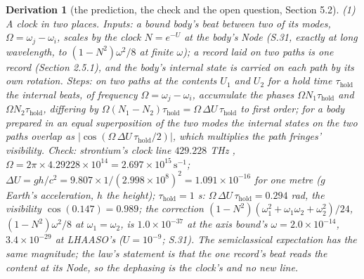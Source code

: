 \documentclass[pdflatex,sn-mathphys-num]{sn-jnl}
\theoremstyle{thmstyleone}
\newtheorem{derivation}{Derivation}
\begin{document}
\begin{derivation}[the prediction, the check and the open question, Section 5.2]
\emph{(1) A clock in two places.} \emph{Inputs:} a bound body's beat between two of its modes, $\Omega = \omega_j - \omega_i$, scales by the clock $N = e^{-U}$ at the body's Node (S.31, exactly at long wavelength, to $(1 - N^2)\omega^2 / 8$ at finite $\omega$); a record laid on two paths is one record (Section 2.5.1), and the body's internal state is carried on each path by its own rotation. \emph{Steps:} on two paths at the contents $U_1$ and $U_2$ for a hold time $\tau_{\mathrm{hold}}$ the internal beats, of frequency $\Omega = \omega_j - \omega_i$, accumulate the phases $\Omega N_1 \tau_{\mathrm{hold}}$ and $\Omega N_2 \tau_{\mathrm{hold}}$, differing by $\Omega(N_1 - N_2)\tau_{\mathrm{hold}} = \Omega\,\Delta U\,\tau_{\mathrm{hold}}$ to first order; for a body prepared in an equal superposition of the two modes the internal states on the two paths overlap as $|\cos(\Omega\,\Delta U\,\tau_{\mathrm{hold}} / 2)|$, which multiplies the path fringes' visibility. \emph{Check:} strontium's clock line $429.228$ THz \cite{sr_clock}, $\Omega = 2\pi \times 4.29228 \times 10^{14} = 2.697 \times 10^{15}\,\mathrm{s}^{-1}$; $\Delta U = gh / c^2 = 9.807 \times 1 / (2.998 \times 10^8)^2 = 1.091 \times 10^{-16}$ for one metre ($g$ Earth's acceleration, $h$ the height); $\tau_{\mathrm{hold}} = 1$ s: $\Omega\,\Delta U\,\tau_{\mathrm{hold}} = 0.294$ rad, the visibility $\cos(0.147) = 0.989$; the correction $(1 - N^2)(\omega_1^2 + \omega_1\omega_2 + \omega_2^2) / 24$, $(1 - N^2)\omega^2 / 8$ at $\omega_1 = \omega_2$, is $1.0 \times 10^{-37}$ at the axis bound's $\omega = 2.0 \times 10^{-14}$, $3.4 \times 10^{-29}$ at LHAASO's ($U = 10^{-9}$; S.31). The semiclassical expectation \cite{zych} has the same magnitude; the law's statement is that the one record's beat reads the content at its Node, so the dephasing is the clock's and no new line.

\end{derivation}
\end{document}

